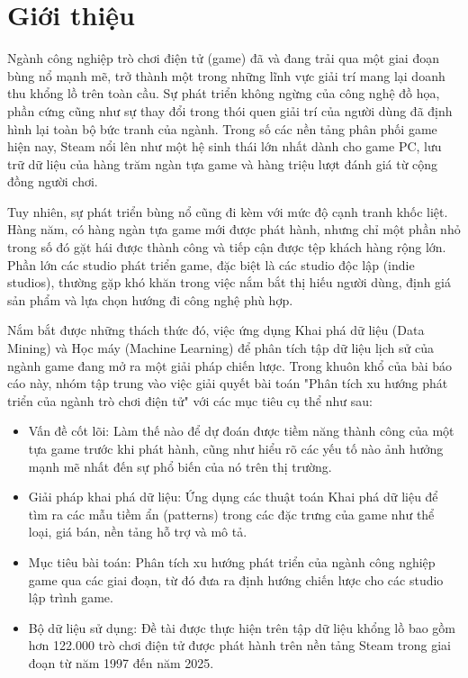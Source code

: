 \section{Giới thiệu}
\hspace{1cm} Ngành công nghiệp trò chơi điện tử (game) đã và đang trải qua một giai đoạn bùng nổ mạnh mẽ, trở thành một trong những lĩnh vực giải trí mang lại doanh thu khổng lồ trên toàn cầu. Sự phát triển không ngừng của công nghệ đồ họa, phần cứng cũng như sự thay đổi trong thói quen giải trí của người dùng đã định hình lại toàn bộ bức tranh của ngành. Trong số các nền tảng phân phối game hiện nay, Steam nổi lên như một hệ sinh thái lớn nhất dành cho game PC, lưu trữ dữ liệu của hàng trăm ngàn tựa game và hàng triệu lượt đánh giá từ cộng đồng người chơi.

\hspace{1cm} Tuy nhiên, sự phát triển bùng nổ cũng đi kèm với mức độ cạnh tranh khốc liệt. Hàng năm, có hàng ngàn tựa game mới được phát hành, nhưng chỉ một phần nhỏ trong số đó gặt hái được thành công và tiếp cận được tệp khách hàng rộng lớn. Phần lớn các studio phát triển game, đặc biệt là các studio độc lập (indie studios), thường gặp khó khăn trong việc nắm bắt thị hiếu người dùng, định giá sản phẩm và lựa chọn hướng đi công nghệ phù hợp.

\hspace{1cm} Nắm bắt được những thách thức đó, việc ứng dụng Khai phá dữ liệu (Data Mining) và Học máy (Machine Learning) để phân tích tập dữ liệu lịch sử của ngành game đang mở ra một giải pháp chiến lược. Trong khuôn khổ của bài báo cáo này, nhóm tập trung vào việc giải quyết bài toán "Phân tích xu hướng phát triển của ngành trò chơi điện tử" với các mục tiêu cụ thể như sau:
\begin{itemize}
    \item Vấn đề cốt lõi: Làm thế nào để dự đoán được tiềm năng thành công của một tựa game trước khi phát hành, cũng như hiểu rõ các yếu tố nào ảnh hưởng mạnh mẽ nhất đến sự phổ biến của nó trên thị trường.
    \item Giải pháp khai phá dữ liệu: Ứng dụng các thuật toán Khai phá dữ liệu để tìm ra các mẫu tiềm ẩn (patterns) trong các đặc trưng của game như thể loại, giá bán, nền tảng hỗ trợ và mô tả.
    \item Mục tiêu bài toán: Phân tích xu hướng phát triển của ngành công nghiệp game qua các giai đoạn, từ đó đưa ra định hướng chiến lược cho các studio lập trình game.
    \item Bộ dữ liệu sử dụng: Đề tài được thực hiện trên tập dữ liệu khổng lồ bao gồm hơn 122.000 trò chơi điện tử được phát hành trên nền tảng Steam trong giai đoạn từ năm 1997 đến năm 2025.
\end{itemize}

